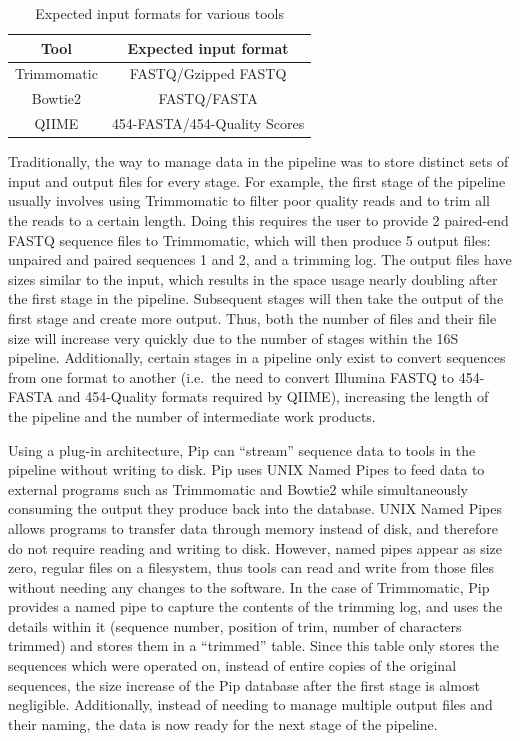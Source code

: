 \documentclass[12pt]{article}
\begin{document}
	\begin{table}
		\centering
		\begin{tabular}{c|c}
		\hline
		Tool & Expected input format\\
		\hline
		Trimmomatic & FASTQ/Gzipped FASTQ\\
		\hline
		Bowtie2 & FASTQ/FASTA\\
		\hline
		QIIME & 454-FASTA/454-Quality Scores\\
		\hline
		\end{tabular}
		\caption{Expected input formats for various tools}
		\label{tab:expected_input}
	\end{table}
	Traditionally, the way to manage data in the pipeline was to store distinct sets of input 
	and output files for every stage. For example, the first stage of 
	the pipeline usually involves using Trimmomatic to filter poor quality reads 
	and to trim all the reads to a certain length. Doing this requires the user to
	provide 2 paired-end FASTQ sequence files to Trimmomatic, which will then produce
	5 output files: unpaired and paired sequences 1 and 2, and a trimming log. The 
	output files have sizes similar to the input, which results in the space usage
	nearly doubling after the first stage in the pipeline. Subsequent stages will
	then take the output of the first stage and create more output. Thus, both
	the number of files and their file size will increase very quickly due to the 
	number of stages within the 16S pipeline. Additionally, certain stages in a pipeline only exist to convert sequences from 
	one format to another (i.e.\ the need to convert Illumina FASTQ to 454-FASTA and 
	454-Quality formats required by QIIME), increasing the length of the pipeline 
	and the number of intermediate work products.
	
	Using a plug-in architecture, Pip can ``stream'' sequence data to tools in the
	pipeline without writing to disk. Pip uses UNIX Named Pipes to feed data to 
	external programs such as Trimmomatic and Bowtie2 while simultaneously consuming 
	the output they produce back into the database. UNIX Named Pipes allows programs to transfer
	data through memory instead of disk, and therefore do not require reading and
	writing to disk. However, named pipes appear as size zero, regular files on a filesystem,
	thus tools can read and write from those files without needing any changes
	to the software. In the case of Trimmomatic, Pip provides a named pipe to capture
	the contents of the trimming log, and uses the details within it (sequence number, 
	position of trim, number of characters trimmed) and stores them in a ``trimmed''
	table. Since this table only stores the sequences which were operated on, instead 
	of entire copies of the original sequences, the size increase of the Pip database
	after the first stage is almost negligible. Additionally, instead of needing to
	manage multiple output files and their naming, the data is now ready for the 
	next stage of the pipeline.
\end{document}
